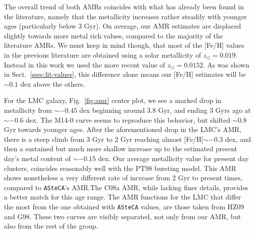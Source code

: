 \documentclass[draft]{aa}
\begin{document}
The overall trend of both AMRs coincides with what has already been found in the
literature, namely that the metallicity increases rather steadily with younger 
ages (particularly below 3 Gyr). On average, our AMR estimates are displaced
slightly towards more metal rich values, compared to the majority of the
literature AMRs.
We must keep in mind though, that most of the [Fe/H] values in the previous
literature are obtained using a solar metallicity of $z_{\odot}{=}0.019$.
Instead in this work we used the more recent value of $z_{\odot}{=}0.0152$. As
was shown in Sect.~\ref{ssec:lit-values}, this difference alone means our [Fe/H]
estimates will be ${\sim}0.1$ dex above the others.

For the LMC galaxy, Fig.~\ref{fig:amr} center plot, we see a marked
drop in metallicity from ${\sim-}0.45$ dex beginning around 3.8 Gyr, and
ending 3 Gyrs ago at ${\sim-}0.6$ dex. The M14-0 curve seems to reproduce this
behavior, but shifted ${\sim}0.8$ Gyr towards younger ages.
%
%
%
After the aforementioned drop in the LMC's AMR, there is a steep climb from 3
Gyr to 2 Gyr reaching almost [Fe/H]${\sim-}0.3$ dex, and then a sustained but
much more shallow increase up to the estimated present day's metal content of
${\sim-}0.15$ dex.
%
Our average metallicity value for present day clusters, coincides reasonably
well with the PT98 bursting model. This AMR shows nonetheless a very different
rate of increase from 2 Gyr to present times, compared to \texttt{ASteCA}'s
AMR.\@ The C08a AMR, while lacking finer details, provides a better
match for this age range.
The AMR functions for the LMC that differ the most from the one obtained
with \texttt{ASteCA} values, are those taken from HZ09 and G98. These two curves
are visibly separated, not only from our AMR, but also from the rest of the
group.
\end{document}
